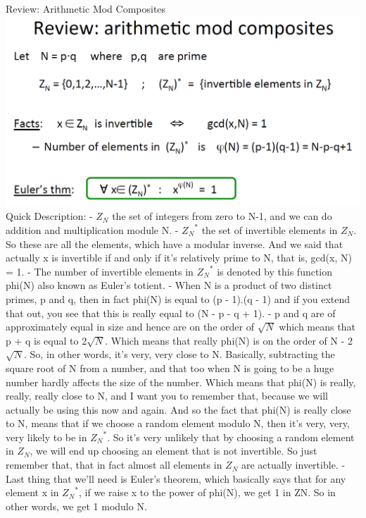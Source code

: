 \documentclass[11pt]{article}
\makeatletter
\def\maxwidth{\ifdim\Gin@nat@width>\linewidth\linewidth
    \else\Gin@nat@width\fi}
\let\Oldincludegraphics\includegraphics
\renewcommand{\includegraphics}[1]{\Oldincludegraphics[width=.8\maxwidth]{#1}}
\makeatother
\begin{document}
Review: Arithmetic Mod Composites
\includegraphics{./Images/ArithmeticMod-Review.png} Quick Description: -
\(Z_{N}\) the set of integers from zero to N-1, and we can do addition
and multiplication module N. - \({Z_{N}}^{*}\) the set of invertible
elements in \(Z_{N}\). So these are all the elements, which have a
modular inverse. And we said that actually x is invertible if and only
if it's relatively prime to N, that is, gcd(x, N) = 1. - The number of
invertible elements in \({Z_{N}}^{*}\) is denoted by this function
phi(N) also known as Euler's totient. - When N is a product of two
distinct primes, p and q, then in fact phi(N) is equal to (p - 1).(q -
1) and if you extend that out, you see that this is really equal to (N -
p - q + 1). - p and q are of approximately equal in size and hence are
on the order of \(\sqrt{N}\) which means that p + q is equal to
2\(\sqrt{N}\). Which means that really phi(N) is on the order of N -
2\(\sqrt{N}\). So, in other words, it's very, very close to N.
Basically, subtracting the square root of N from a number, and that too
when N is going to be a huge number hardly affects the size of the
number. Which means that phi(N) is really, really, really close to N,
and I want you to remember that, because we will actually be using this
now and again. And so the fact that phi(N) is really close to N, means
that if we choose a random element modulo N, then it's very, very, very
likely to be in \({Z_{N}}^{*}\). So it's very unlikely that by choosing
a random element in \(Z_{N}\), we will end up choosing an element that
is not invertible. So just remember that, that in fact almost all
elements in \(Z_{N}\) are actually invertible. - Last thing that we'll
need is Euler's theorem, which basically says that for any element x in
\({Z_{N}}^{*}\), if we raise x to the power of phi(N), we get 1 in ZN.
So in other words, we get 1 modulo N.
\end{document}
